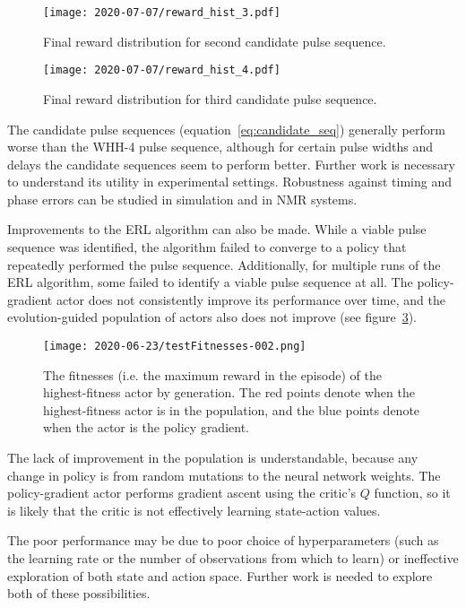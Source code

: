 \documentclass{article}
\begin{document}
\begin{figure}[H]
    \centering
    \texttt{[image: 2020-07-07/reward\_hist\_3.pdf]}
    \caption{Final reward distribution for second candidate pulse sequence.}
    \label{fig:candidate_2}
\end{figure}

\begin{figure}[H]
    \centering
    \texttt{[image: 2020-07-07/reward\_hist\_4.pdf]}
    \caption{Final reward distribution for third candidate pulse sequence.}
    \label{fig:candidate_3}
\end{figure}

The candidate pulse sequences (equation~\ref{eq:candidate_seq}) generally perform worse than the WHH-4 pulse sequence, although for certain pulse widths and delays the candidate sequences seem to perform better. Further work is necessary to understand its utility in experimental settings. Robustness against timing and phase errors can be studied in simulation and in NMR systems.

Improvements to the ERL algorithm can also be made. While a viable pulse sequence was identified, the algorithm failed to converge to a policy that repeatedly performed the pulse sequence. Additionally, for multiple runs of the ERL algorithm, some failed to identify a viable pulse sequence at all. The policy-gradient actor does not consistently improve its performance over time, and the evolution-guided population of actors also does not improve (see figure~\ref{fig:results}).
\begin{figure}[H]
    \centering
    \texttt{[image: 2020-06-23/testFitnesses-002.png]}
    \caption{The fitnesses (i.e. the maximum reward in the episode) of the highest-fitness actor by generation. The red points denote when the highest-fitness actor is in the population, and the blue points denote when the actor is the policy gradient.}
    \label{fig:results}
\end{figure}
The lack of improvement in the population is understandable, because any change in policy is from random mutations to the neural network weights. The policy-gradient actor performs gradient ascent using the critic's $Q$ function, so it is likely that the critic is not effectively learning state-action values.

The poor performance may be due to poor choice of hyperparameters (such as the learning rate or the number of observations from which to learn) or ineffective exploration of both state and action space.
Further work is needed to explore both of these possibilities.

\printbibliography
\end{document}
